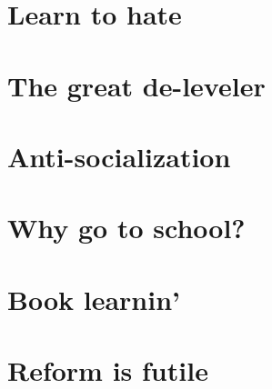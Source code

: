 \chapter{Learn to hate}\label{chap:hate}

\chapter{The great de-leveler}\label{chap:disparity}

\chapter{Anti-socialization}\label{chap:social}

\chapter{Why go to school?}\label{chap:why}

\chapter{Book learnin'}\label{chap:book}

\chapter{Reform is futile}
